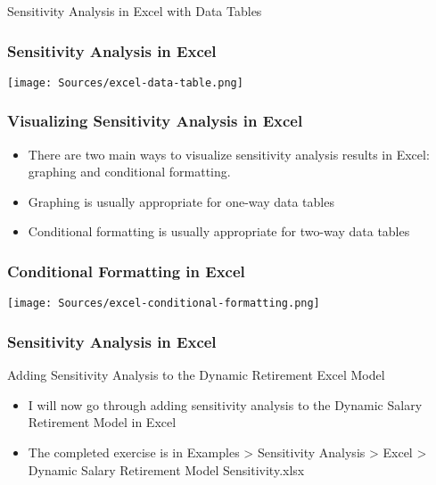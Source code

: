 \documentclass[handout, 11pt]{beamer}
\begin{document}
\begin{section}[SA Excel]{Sensitivity Analysis in Excel with Data Tables}
\begin{frame}
\frametitle{Sensitivity Analysis in Excel}
\begin{center}
\begin{adjustbox}{width=0.9\textwidth, height=0.8\textheight, keepaspectratio}
\texttt{[image: Sources/excel-data-table.png]}
\end{adjustbox}
\end{center}
\end{frame}
\begin{frame}
\frametitle{Visualizing Sensitivity Analysis in Excel}
\begin{itemize}
\item There are two main ways to visualize sensitivity analysis results in Excel: graphing and conditional formatting.
\vfill
\item Graphing is usually appropriate for one-way data tables
\vfill
\item Conditional formatting is usually appropriate for two-way data tables
\end{itemize}
\end{frame}
\begin{frame}
\frametitle{Conditional Formatting in Excel}
\begin{center}
\begin{adjustbox}{width=0.9\textwidth, height=0.8\textheight, keepaspectratio}
\texttt{[image: Sources/excel-conditional-formatting.png]}
\end{adjustbox}
\end{center}
\end{frame}
\begin{frame}
\frametitle{Sensitivity Analysis in Excel}
{
\begin{block}{Adding Sensitivity Analysis to the Dynamic Retirement Excel Model}
\begin{itemize}
\item I will now go through adding sensitivity analysis to the Dynamic Salary Retirement Model in Excel
\item The completed exercise is in Examples > Sensitivity Analysis > Excel > Dynamic Salary Retirement Model Sensitivity.xlsx
\end{itemize}
\end{block}
}
\end{frame}
\begin{frame}

\end{frame}
\end{section}
\end{document}
